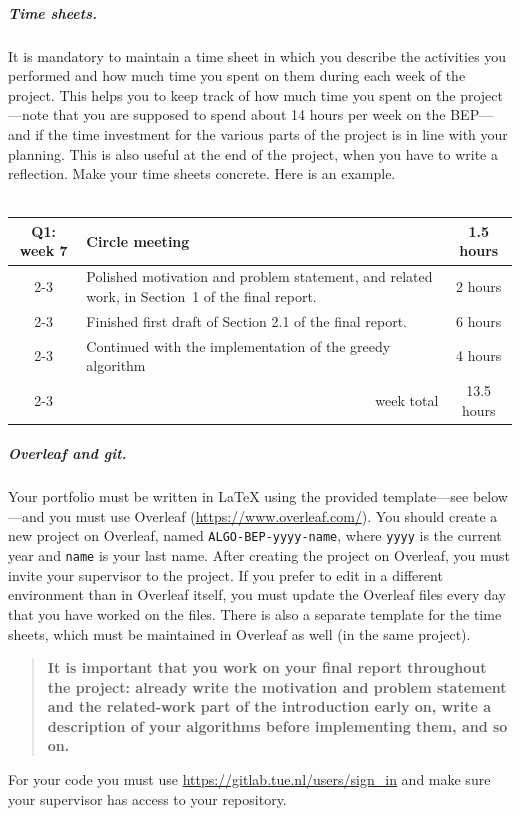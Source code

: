 \documentclass[report,english,cleveref,autoref,a4paper]{lipics-v2021}
\begin{document}
\subparagraph{Time sheets.}
It is mandatory to maintain a time sheet in which you describe the activities 
you performed and how much time you spent on them during each week of 
the project. This helps you to keep track of how much time you spent on the 
project---note that you are supposed to spend about 14 hours per week on the BEP---and if the time investment 
for the various parts of the project is in line with your planning.
This is also useful at the end of the project, when you have to write a reflection.
Make your time sheets concrete. 
Here is  an example.
\\ \\
\begin{tabular}{c| m{10cm}|c}
\hline\hline
Q1: week 7  & Circle meeting & 1.5 hours \\
\cline{2-3}
     & Polished motivation and problem statement, and
     related work, in Section~1 of the final report. & 2 hours \\
\cline{2-3}
     & Finished first draft of Section 2.1 of the final report. & 6 hours \\
\cline{2-3}
     & Continued with the implementation of the greedy algorithm  & 4 hours \\
\cline{2-3}
     & \multicolumn{1}{r|}{week total} & 13.5 hours \\
\hline \hline
\end{tabular}


\subparagraph{Overleaf and git.}
Your portfolio must be written in \LaTeX{} using the provided template---see below---and
you must use Overleaf (\url{https://www.overleaf.com/}). You should create a new
project on Overleaf, named \texttt{ALGO-BEP-yyyy-name}, where \texttt{yyyy} is 
the current year and \texttt{name} is your last name. After creating the project
on Overleaf, you must invite your supervisor to the project. If you prefer to
edit in a different environment than in Overleaf itself, you must update
the Overleaf files every day that you have worked on the files.
There is also a separate template for the time sheets, which must be maintained in Overleaf as well
(in the same project).
\begin{quote}
\noindent \textbf{It is important that you work on your final report throughout the project:
already write the motivation and problem statement and the related-work part of
the introduction early on, write a description of your algorithms before implementing them,
and so on.}
\end{quote}
For your code you must use \url{https://gitlab.tue.nl/users/sign_in} and make sure
your supervisor has access to your repository.
\end{document}

